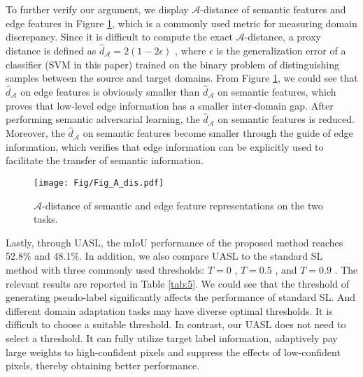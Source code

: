 \documentclass[sigconf]{acmart}
\begin{document}
\par To further verify our argument, we display $\mathcal{A}$-distance \cite{ben2007analysis} of semantic features and edge features in Figure \ref{fig:6}, which is a commonly used metric for measuring domain discrepancy. Since it is difficult to compute the exact $\mathcal{A}$-distance, a proxy distance is defined as $\hat{d}_{\mathcal{A}}=2(1-2 \epsilon)$ \cite{ben2007analysis}, where $\epsilon$ is the generalization error of a classifier (SVM in this paper) trained on the binary problem of distinguishing samples between the source and target domains. From Figure \ref{fig:6}, we could see that $\hat{d}_{\mathcal{A}}$ on edge features is obviously smaller than $\hat{d}_{\mathcal{A}}$ on semantic features, which proves that low-level edge information has a smaller inter-domain gap. After performing semantic adversarial learning, the $\hat{d}_{\mathcal{A}}$ on semantic features is reduced. Moreover, the $\hat{d}_{\mathcal{A}}$ on semantic features become smaller through the guide of edge information, which verifies that edge information can be explicitly used to facilitate the transfer of semantic information. 

\begin{figure}[!t]
    \centering
    \texttt{[image: Fig/Fig\_A\_dis.pdf]}
    \caption{$\mathcal{A}$-distance of semantic and edge feature representations on the two tasks.}
    \label{fig:6}
\end{figure}

\par Lastly, through UASL, the mIoU performance of the proposed method reaches 52.8$\%$ and 48.1$\%$. In addition, we also compare UASL to the standard SL method with three commonly used thresholds: $T=0$ \cite{pan2020unsupervised}, $T=0.5$  \cite{lian2019constructing}, and $T=0.9$ \cite{kim2020learning}. The relevant results are reported in Table \ref{tab:5}. We could see that the threshold of generating pseudo-label  significantly affects the performance of standard SL. And different domain adaptation tasks may have diverse optimal thresholds. It is difficult to choose a suitable threshold. In contrast, our UASL does not need to select a threshold. It can fully utilize target label information, adaptively pay large weights to high-confident pixels and suppress the effects of low-confident pixels, thereby obtaining better performance.
\end{document}
